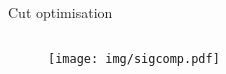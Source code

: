 \documentclass{beamer}
\begin{document}
\begin{frame}{Cut optimisation}
  \begin{columns}
    \begin{column}{0.5\textwidth}\begin{figure}
      \texttt{[image: img/sigcomp.pdf]}
    \end{figure}\end{column}
  \end{columns}
\end{frame}

%
%
%
%
\end{document}
